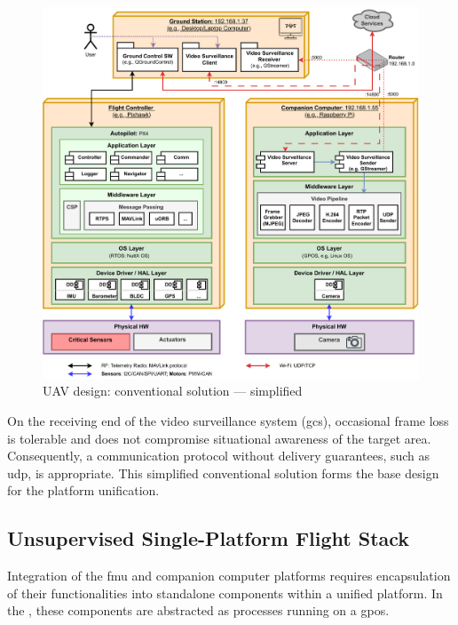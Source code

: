 \begin{figure}[!hbt]
  \centering
  \includegraphics[width=1.0\textwidth]{./img/pdf/uav-main-design-conv-sol-2.pdf} 
%   
  \caption{UAV design: conventional solution --- simplified}%
  \label{fig:uav-design-conv-sol-2}
\end{figure}

On the receiving end of the video surveillance system (\gls{gcs}), occasional frame loss is tolerable and does not compromise situational awareness of the target area. Consequently, a communication protocol without delivery guarantees, such as \gls{udp}, is appropriate.
%
This simplified conventional solution forms the base design for the platform
unification.

\subsection{Unsupervised Single-Platform Flight Stack}
\label{sec:unsuperv-stack}
Integration of the \gls{fmu} and companion computer platforms requires encapsulation of their functionalities into standalone components within a unified platform. In the , these components are abstracted as processes running on a \gls{gpos}.

